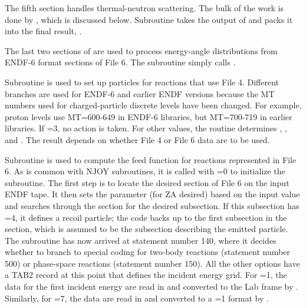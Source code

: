 The fifth section handles thermal-neutron scattering.  The bulk of the
work is done by , which is
discussed below.  Subroutine  takes the output of
 and packs it into the final result, .

The last two sections of  are used to process energy-angle
distributions from ENDF-6 format sections of File 6.  The subroutine
simply calls .

Subroutine  is used to set
up particles for reactions that use File 4.  Different branches are
used for ENDF-6 and earlier ENDF versions because the MT numbers
used for charged-particle discrete levels have been changed.  For
example, proton levels use MT=600-649 in ENDF-6 libraries, but
MT=700-719 in earlier libraries.  If =3, no action
is taken.  For other  values, the routine determines
, , and .  The
result depends on whether File 4 or File 6 data are to be used.

Subroutine  is used
to compute the feed function for reactions represented in File 6.
As is common with NJOY subroutines, it is called with =0
to initialize the subroutine.  The first step is to locate the
desired section of File 6 on the input ENDF tape.  It then sets
the parameter  (for ZA desired) based on the input
value  and searches through the section for the
desired subsection.  If this subsection has =4, it
defines a recoil particle; the code backs up to the first
subsection in the section, which is assumed to be the subsection
describing the emitted particle.  The subroutine has now arrived at
statement number 140, where it decides whether to branch to special
coding for two-body reactions (statement number 500) or phase-space
reactions (statement number 150).  All the other options have a TAB2
record at this point that defines the incident energy grid.  For
=1, the data for the first incident energy are read in
and converted to the Lab frame by .  Similarly, for
=7, the data are read in and converted to a =1
format by .

